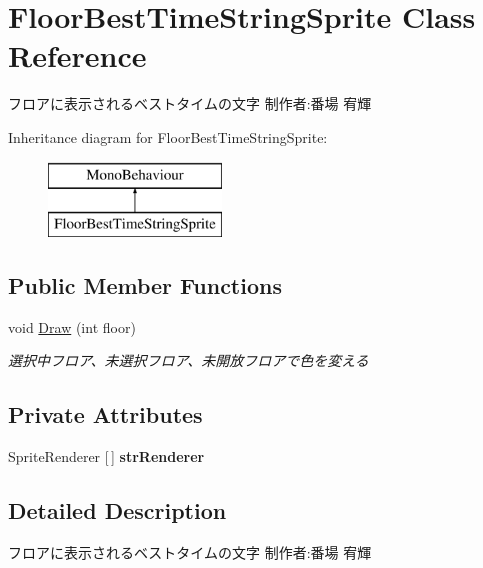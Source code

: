 \hypertarget{class_floor_best_time_string_sprite}{}\section{Floor\+Best\+Time\+String\+Sprite Class Reference}
\label{class_floor_best_time_string_sprite}


フロアに表示されるベストタイムの文字 制作者\+:番場 宥輝  


Inheritance diagram for Floor\+Best\+Time\+String\+Sprite\+:\begin{figure}[H]
\begin{center}
\leavevmode
\includegraphics[height=2.000000cm]{class_floor_best_time_string_sprite}
\end{center}
\end{figure}
\subsection*{Public Member Functions}
\begin{DoxyCompactItemize}
\item 
void \hyperlink{class_floor_best_time_string_sprite_a3b64bc5236525a2695b79a7ad95c130f}{Draw} (int floor)
\begin{DoxyCompactList}\small\item\em 選択中フロア、未選択フロア、未開放フロアで色を変える \end{DoxyCompactList}\end{DoxyCompactItemize}
\subsection*{Private Attributes}
\begin{DoxyCompactItemize}
\item 
\mbox{\label{class_floor_best_time_string_sprite_afa6929874fa8270fa104ab1de7343643}} 
Sprite\+Renderer \mbox{[}$\,$\mbox{]} {\bfseries str\+Renderer}
\end{DoxyCompactItemize}


\subsection{Detailed Description}
フロアに表示されるベストタイムの文字 制作者\+:番場 宥輝 



